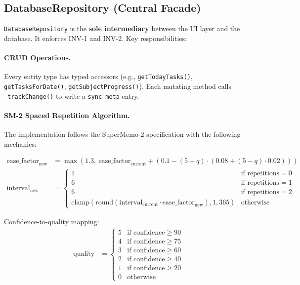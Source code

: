 \documentclass[12pt,a4paper,openany]{report}
\begin{document}
\subsection{DatabaseRepository (Central Facade)}

\texttt{DatabaseRepository} is the \textbf{sole intermediary} between the UI layer and the database. It enforces INV-1 and INV-2. Key responsibilities:

\paragraph{CRUD Operations.}
Every entity type has typed accessors (e.g., \texttt{getTodayTasks()}, \texttt{getTasksForDate()}, \texttt{getSubjectProgress()}). Each mutating method calls \texttt{\_trackChange()} to write a \texttt{sync\_meta} entry.

\paragraph{SM-2 Spaced Repetition Algorithm.}

The implementation follows the SuperMemo-2 specification with the following mechanics:

\begin{align}
\text{ease\_factor}_{\text{new}} &= \max\left(1.3,\ \text{ease\_factor}_{\text{current}} + \left(0.1 - (5 - q) \cdot (0.08 + (5 - q) \cdot 0.02)\right)\right) \\
\text{interval}_{\text{new}} &= 
\begin{cases}
1 & \text{if repetitions} = 0 \\
6 & \text{if repetitions} = 1 \\
6 & \text{if repetitions} = 2 \\
\text{clamp}(\text{round}(\text{interval}_{\text{current}} \cdot \text{ease\_factor}_{\text{new}}), 1, 365) & \text{otherwise}
\end{cases}
\end{align}

Confidence-to-quality mapping:
\begin{align}
\text{quality} &= 
\begin{cases}
5 & \text{if confidence} \ge 90 \\
4 & \text{if confidence} \ge 75 \\
3 & \text{if confidence} \ge 60 \\
2 & \text{if confidence} \ge 40 \\
1 & \text{if confidence} \ge 20 \\
0 & \text{otherwise}
\end{cases}
\end{align}
\end{document}
